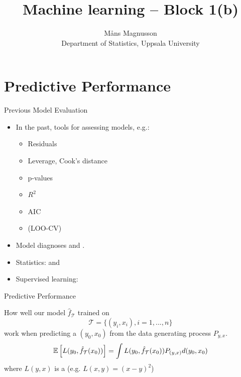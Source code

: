 \documentclass[10pt]{beamer}
\title[]{{\color{black}Machine learning -- Block 1(b)}}
\author[]{M{\aa}ns Magnusson\\Department of Statistics, Uppsala University}
\date{\currentsemester}
\begin{document}
\frame{\titlepage
}







\section{Predictive Performance}
\frame{\sectionpage}

\begin{frame}{Previous Model Evaluation}
\begin{itemize}
\item In the past, tools for assessing models, e.g.:
\begin{itemize}
\item Residuals
\item Leverage, Cook's distance
\item p-values
\item $R^2$
\item AIC
\item (LOO-CV)
\end{itemize}
\item Model diagnoses and .
\pause
\item Statistics:  and 
\pause
\item Supervised learning: 
\end{itemize}
\end{frame}


\begin{frame}{Predictive Performance}


How well our model $\hat{f}_\mathcal{T}$ trained on
\[
\mathcal{T}=\{(y_i, x_i), i = 1, ..., n\}
\]
work when predicting a  $(y_0,x_0)$ from the data generating process $P_{y,x}$.
\[
\operatorname{\mathbb{E}}\left[L(y_0,\hat{f}_\mathcal{T}(x_0))\right] = \int L(y_0, \hat{f}_\mathcal{T}(x_0)) P_{(y,x)} d(y_0,x_0)
\]
where $L(y,x)$ is a  (e.g. $L(x,y) = (x-y)^2$)

\end{frame}
\end{document}
